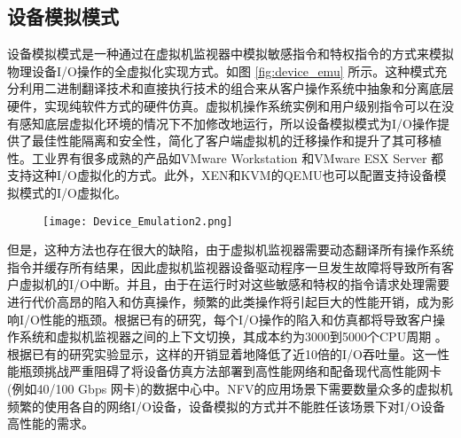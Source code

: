 \subsection{设备模拟模式}
设备模拟模式是一种通过在虚拟机监视器中模拟敏感指令和特权指令的方式来模拟物理设备I/O操作的全虚拟化实现方式。如图 \ref{fig:device_emu} 所示。这种模式充分利用二进制翻译技术和直接执行技术的组合来从客户操作系统中抽象和分离底层硬件，实现纯软件方式的硬件仿真。虚拟机操作系统实例和用户级别指令可以在没有感知底层虚拟化环境的情况下不加修改地运行，所以设备模拟模式为I/O操作提供了最佳性能隔离和安全性，简化了客户端虚拟机的迁移操作和提升了其可移植性。工业界有很多成熟的产品如VMware Workstation  和VMware ESX Server  都支持这种I/O虚拟化的方式。此外，XEN和KVM的QEMU也可以配置支持设备模拟模式的I/O虚拟化。
\begin{figure}[!htp]
	\centering
	\texttt{[image: Device\_Emulation2.png]}
\end{figure}
但是，这种方法也存在很大的缺陷，由于虚拟机监视器需要动态翻译所有操作系统指令并缓存所有结果，因此虚拟机监视器设备驱动程序一旦发生故障将导致所有客户虚拟机的I/O中断。并且，由于在运行时对这些敏感和特权的指令请求处理需要进行代价高昂的陷入和仿真操作，频繁的此类操作将引起巨大的性能开销，成为影响I/O性能的瓶颈。根据已有的研究，每个I/O操作的陷入和仿真都将导致客户操作系统和虚拟机监视器之间的上下文切换，其成本约为3000到5000个CPU周期 。根据已有的研究实验显示，这样的开销显着地降低了近10倍的I/O吞吐量。这一性能瓶颈挑战严重阻碍了将设备仿真方法部署到高性能网络和配备现代高性能网卡(例如40/100 Gbps 网卡)的数据中心中。NFV的应用场景下需要数量众多的虚拟机频繁的使用各自的网络I/O设备，设备模拟的方式并不能胜任该场景下对I/O设备高性能的需求。


